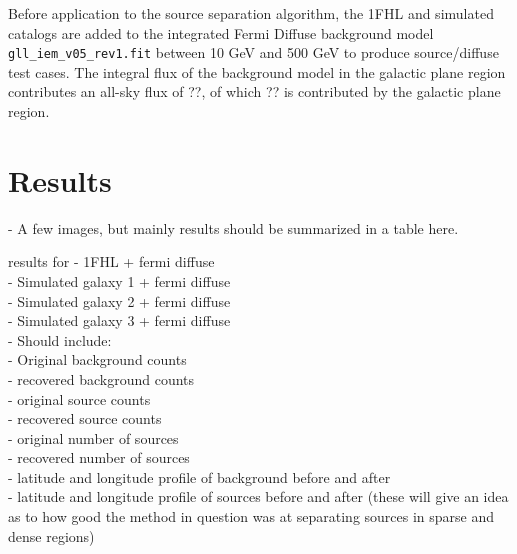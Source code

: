 \documentclass{PoS}
\begin{document}
\begin{table}
\centering
{}
\caption{Galactic plane fluxes for source population catalogs.}
\end{table}

Before application to the source separation algorithm, the 1FHL and simulated catalogs are added to the integrated Fermi Diffuse background model \verb|gll_iem_v05_rev1.fit| between 10 GeV and 500 GeV to produce source/diffuse test cases. The integral flux of the background model in the galactic plane region contributes an all-sky flux of ??, of which ?? is contributed by the galactic plane region.


\section{Results}
- A few images, but mainly results should be summarized in a table here.

results for
- 1FHL + fermi diffuse\\
- Simulated galaxy 1 + fermi diffuse\\
- Simulated galaxy 2 + fermi diffuse\\
- Simulated galaxy 3 + fermi diffuse\\

- Should include:\\
    - Original background counts\\
    - recovered background counts\\
    - original source counts\\
    - recovered source counts\\
    - original number of sources\\
    - recovered number of sources\\
    - latitude and longitude profile of background before and after\\
    - latitude and longitude profile of sources before and after
        (these will give an idea as to how good the method in question was at separating sources in sparse and dense regions)
    
\end{document}
